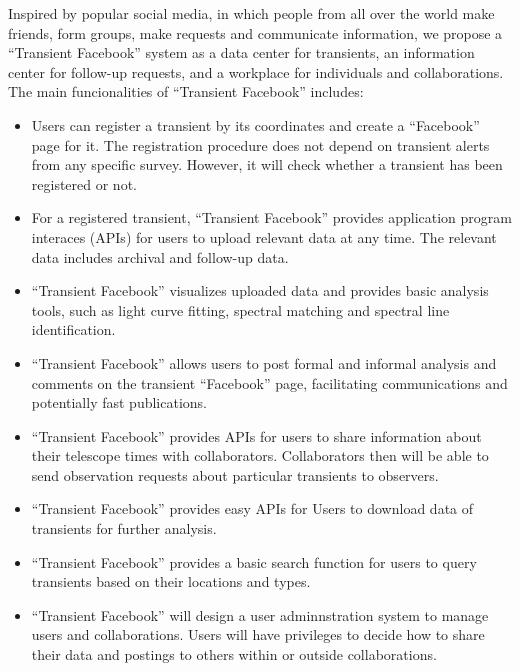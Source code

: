 \documentclass[11pt]{article}
\begin{document}
Inspired by popular social media, in which people from all over the
world make friends, form groups, make requests and communicate
information, we propose a ``Transient Facebook'' system as a data
center for transients, an information center for follow-up requests,
and a workplace for individuals and collaborations. The main
funcionalities of ``Transient Facebook'' includes:
\begin{itemize}
\item Users can register a transient by its coordinates and create a
  ``Facebook'' page for it. The registration procedure does not depend
  on transient alerts from any specific survey. However, it will check
  whether a transient has been registered or not.

\item For a registered transient, ``Transient Facebook'' provides
  application program interaces (APIs) for users to upload relevant
  data at any time. The relevant data includes archival and follow-up
  data.

\item ``Transient Facebook'' visualizes uploaded data and provides
  basic analysis tools, such as light curve fitting, spectral matching
  and spectral line identification.

\item ``Transient Facebook'' allows users to post formal and informal
  analysis and comments on the transient ``Facebook'' page,
  facilitating communications and potentially fast publications.

\item ``Transient Facebook'' provides APIs for users to share
  information about their telescope times with
  collaborators. Collaborators then will be able to send observation
  requests about particular transients to observers.

\item ``Transient Facebook'' provides easy APIs for Users to download
  data of transients for further analysis.
  
\item ``Transient Facebook'' provides a basic search function
  for users to query transients based on their locations and types.

\item ``Transient Facebook'' will design a user adminnstration system
  to manage users and collaborations. Users will have privileges to
  decide how to share their data and postings to others within or
  outside collaborations.

\end{itemize}
\end{document}
